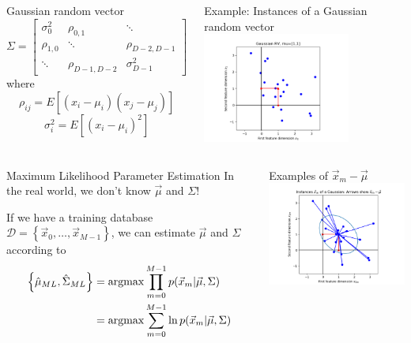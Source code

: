 \documentclass{beamer}
\newcommand{\argmax}{\operatornamewithlimits{argmax}}
\begin{document}
\begin{frame}
  \begin{columns}
    \column{2.25in}
    \begin{block}{Gaussian random vector}
      \[
      \Sigma= \left[\begin{array}{ccc}
          \sigma_0^2 & \rho_{0,1} & \ddots\\
          \rho_{1,0} & \ddots &  \rho_{D-2,D-1}\\
          \ddots & \rho_{D-1,D-2} &  \sigma_{D-1}^2\end{array}\right]
      \]
      where
      \[
      \rho_{ij}=E[(x_i-\mu_i)(x_j-\mu_j)]
      \]
      \[
      \sigma_{i}^2=E[(x_i-\mu_i)^2]
      \]
    \end{block}
    \column{2in}
    \begin{block}{Example: Instances of a Gaussian random vector}
      \includegraphics[width=1.9in]{gaussian_vectors.png}
    \end{block}
  \end{columns}
\end{frame}

\begin{frame}
  \begin{columns}
    \column{2.25in}
    \begin{block}{Maximum Likelihood Parameter Estimation}
      In the real world, we don't know $\vec\mu$ and $\Sigma$!

      If we have a training database ${\mathcal
        D}=\left\{\vec{x}_0,\ldots,\vec{x}_{M-1}\right\}$, we can
      estimate $\vec\mu$ and $\Sigma$ according to
      \begin{align*}
        \left\{\hat\mu_{ML},\hat{\Sigma}_{ML}\right\} &= \argmax
        \prod_{m=0}^{M-1} p(\vec{x}_m|\vec\mu,\Sigma)\\
        &= \argmax
        \sum_{m=0}^{M-1} \ln p(\vec{x}_m|\vec\mu,\Sigma)
      \end{align*}
    \end{block}
    \column{2in}
    \begin{block}{Examples of $\vec{x}_m-\vec\mu$}
      \includegraphics[width=1.9in]{gaussian_subtraction.png}
    \end{block}
  \end{columns}
\end{frame}
\end{document}
